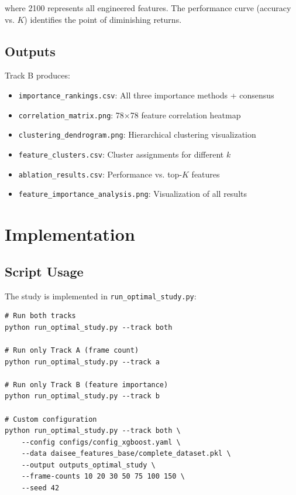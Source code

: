 \documentclass[11pt,a4paper]{article}
\begin{document}
where 2100 represents all engineered features. The performance curve (accuracy vs. $K$) identifies the point of diminishing returns.

\subsection{Outputs}

Track B produces:
\begin{itemize}
    \item \texttt{importance\_rankings.csv}: All three importance methods + consensus
    \item \texttt{correlation\_matrix.png}: 78$\times$78 feature correlation heatmap
    \item \texttt{clustering\_dendrogram.png}: Hierarchical clustering visualization
    \item \texttt{feature\_clusters.csv}: Cluster assignments for different $k$
    \item \texttt{ablation\_results.csv}: Performance vs. top-$K$ features
    \item \texttt{feature\_importance\_analysis.png}: Visualization of all results
\end{itemize}

\section{Implementation}\label{sec:implementation}

\subsection{Script Usage}

The study is implemented in \texttt{run\_optimal\_study.py}:

\begin{lstlisting}[caption={Basic Usage}]
# Run both tracks
python run_optimal_study.py --track both

# Run only Track A (frame count)
python run_optimal_study.py --track a

# Run only Track B (feature importance)
python run_optimal_study.py --track b

# Custom configuration
python run_optimal_study.py --track both \
    --config configs/config_xgboost.yaml \
    --data daisee_features_base/complete_dataset.pkl \
    --output outputs_optimal_study \
    --frame-counts 10 20 30 50 75 100 150 \
    --seed 42
\end{lstlisting}
\end{document}
